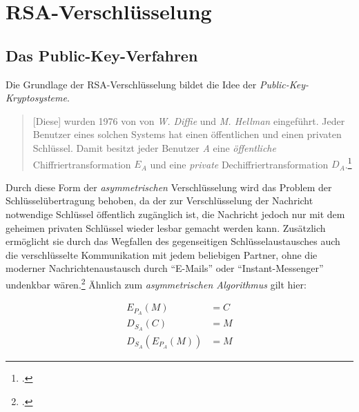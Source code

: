 \documentclass{scrarticle} %
\begin{document}
        \section{RSA-Verschlüsselung} %
        \subsection[Public-Key-Kryptosysteme]{Das Public-Key-Verfahren}
        Die Grundlage der RSA-Verschlüsselung bildet die Idee der \emph{Public-Key-Kryptosysteme}.

        \begin{quote}
            [Diese] wurden 1976 von von \emph{W. Diffie} und \emph{M. Hellman} eingeführt. Jeder Benutzer eines solchen Systems hat einen öffentlichen und einen privaten Schlüssel. Damit besitzt jeder Benutzer \emph{A} eine \emph{öffentliche} Chiffriertransformation $E_A$ und eine \emph{private} Dechiffriertransformation $D_A$.\footcite[67]{watjen2008}
        \end{quote} %
        Durch diese Form der \emph{asymmetrischen} Verschlüsselung wird das Problem der Schlüsselübertragung behoben, da der zur Verschlüsselung der Nachricht notwendige Schlüssel öffentlich zugänglich ist, die Nachricht jedoch nur mit dem geheimen privaten Schlüssel wieder lesbar gemacht werden kann. Zusätzlich ermöglicht sie durch das Wegfallen des gegenseitigen Schlüsselaustausches auch die verschlüsselte Kommunikation mit jedem beliebigen Partner, ohne die moderner Nachrichtenaustausch durch \enquote{E-Mails} oder \enquote{Instant-Messenger} undenkbar wären.\footcite[Vgl.][21]{ertel2003} Ähnlich zum \emph{asymmetrischen Algorithmus} gilt hier:

        \begin{align}
            E_{P_A}(M) &= C \\
            D_{S_A}(C) &= M \\
            D_{S_A}\left(E_{P_A}(M)\right) &= M
        \end{align}
\end{document}
